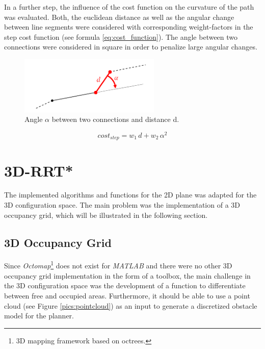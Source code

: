 In a further step, the influence of the cost function on the curvature of the path was evaluated. Both, the euclidean distance as well as the angular change between line segments were considered with corresponding weight-factors in the step cost function (see formula \ref{eq:cost_function}). The angle between two connections were considered in square in order to penalize large angular changes.

\begin{figure} [h]
	\centering
	\includegraphics[width=0.6\textwidth]{images/angle.png}
	\caption{Angle $\alpha$ between two connections and distance d.}
	\label{pics:angle}
\end{figure}

\begin{equation}
cost_{step} = w_{1}\,d+w_{2} \,\alpha^{2}
\label{eq:cost_function}
\end{equation} 

\section{3D-RRT*}

The implemented algorithms and functions for the 2D plane was adapted for the 3D configuration space. The main problem was the implementation of a 3D occupancy grid, which will be illustrated in the following section.    

\subsection{3D Occupancy Grid}
Since \textit{Octomap}\footnote{3D mapping framework based on octrees.} does not exist for \textit{MATLAB} and there were no other 3D occupancy grid implementation in the form of a toolbox, the main challenge in the 3D configuration space was the development of a function to differentiate between free and occupied areas. Furthermore, it should be able to use a point cloud (see Figure \ref{pics:pointcloud}) as an input to generate a discretized obstacle model for the planner.\\

